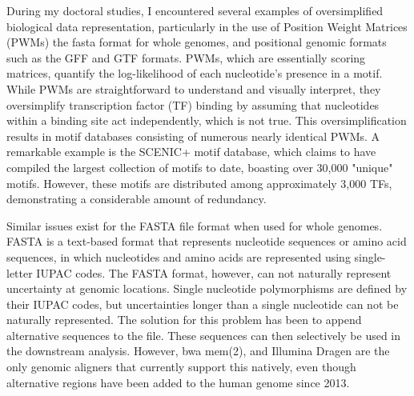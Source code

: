 \bigbreak
During my doctoral studies, I encountered several examples of oversimplified biological data representation, particularly in the use of Position Weight Matrices (PWMs) the fasta format for whole genomes, and positional genomic formats such as the GFF and GTF formats. PWMs, which are essentially scoring matrices, quantify the log-likelihood of each nucleotide's presence in a motif. While PWMs are straightforward to understand and visually interpret, they oversimplify transcription factor (TF) binding by assuming that nucleotides within a binding site act independently, which is not true\cite{Zuo2014,Jolma2015,Luscombe2001}. This oversimplification results in motif databases consisting of numerous nearly identical PWMs. A remarkable example is the SCENIC+ motif database\cite{BravoGonzlezBlas2023}, which claims to have compiled the largest collection of motifs to date, boasting over 30,000 "unique" motifs. However, these motifs are distributed among approximately 3,000 TFs, demonstrating a considerable amount of redundancy. 

Similar issues exist for the FASTA file format when used for whole genomes\cite{Lipman1985}. FASTA is a text-based format that represents nucleotide sequences or amino acid sequences, in which nucleotides and amino acids are represented using single-letter IUPAC codes. The FASTA format, however, can not naturally represent uncertainty at genomic locations. Single nucleotide polymorphisms are defined by their IUPAC codes, but uncertainties longer than a single nucleotide can not be naturally represented. The solution for this problem has been to append alternative sequences to the file. These sequences can then selectively be used in the downstream analysis. However, bwa mem(2)\cite{bwamem,bwamem2}, and Illumina Dragen are the only genomic aligners that currently support this natively, even though alternative regions have been added to the human genome since 2013. 

